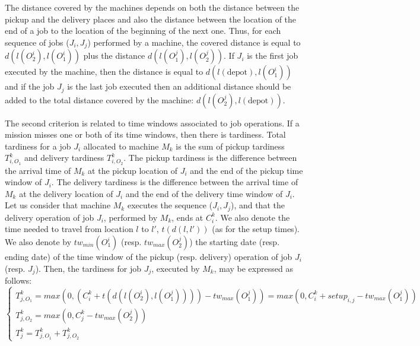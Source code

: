 \documentclass[review]{elsarticle}
\begin{document}
The distance covered by the machines depends on both the distance between the pickup and the delivery places and also the distance between the location of the end of a job to the location of the beginning of the next one. Thus, for each sequence of jobs ($J_i,J_j$) performed by a machine, the covered distance is equal to $d(l(O^i_2), l(O^i_1))$ plus the distance $d(l(O^j_1), l(O^j_2))$. If $J_i$ is the first job executed by the machine, then the distance is equal to $d(l(\mbox{depot}),l(O^i_1))$ and if the job $J_j$ is the last job executed then an additional distance should be added to the total distance covered by the machine: $d(l(O^j_2),l(\mbox{depot}))$.

The second criterion is related to time windows associated to job operations. If a mission misses one or both of its time windows, then there is tardiness. Total tardiness for a job $J_i$ allocated to machine $M_k$ is the sum of pickup tardiness $T^k_{i,O_1}$ and delivery tardiness $T^k_{i,O_2}$. The pickup tardiness is the difference between the arrival time of $M_k$ at the pickup location of $J_i$ and the end of the pickup time window of $J_i$. The delivery tardiness is the difference between the arrival time of $M_k$ at the delivery location of $J_i$ and the end of the delivery time window of $J_i$. \\

Let us consider that machine $M_k$ executes the sequence ($J_i,J_j$), and that the delivery operation of job $J_i$, performed by $M_k$, ends at $C^k_i$. We also denote the time needed to travel from location $l$ to $l'$, $t(d(l,l'))$ (as for the setup times). We also denote by $tw_{min}(O^i_1)$ (resp. $tw_{max}(O^j_2)$) the starting date (resp. ending date) of the time window of the pickup (resp. delivery) operation of job $J_i$ (resp. $J_j$). Then, the tardiness for job $J_j$, executed by $M_k$, may be expressed as follows: 
\begin{equation*}
 \begin{cases}
    T^k_{j,O_1} = max(0, (C^k_i + t(d(l(O^i_2),l(O^j_1)))) - tw_{max}(O^j_1)) = max(0,C^k_i+setup_{i,j}-tw_{max}(O^j_1))\\
    T^k_{j,O_2} = max(0 ,C^k_j - tw_{max}(O^j_2))\\
    T^k_{j} = T^k_{j,O_1} + T^k_{j,O_2}
\end{cases}
\end{equation*}
\end{document}
